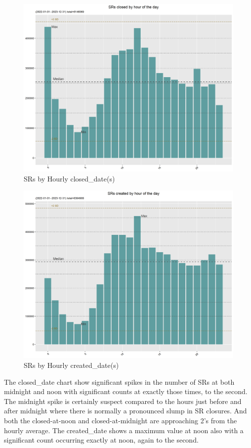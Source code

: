 \documentclass[12pt, titlepage]{article}
\begin{document}
	\begin{figure}[H]
		 \centering
		 \includegraphics[scale = 0.65]{Closed_Hourly_SR_count.png}
		 \caption{SRs by Hourly closed\_date(s)}
		 \label{fig:hourly-closed}
	\end{figure}	
	
	\begin{figure}[H]
		 \centering
		 \includegraphics[scale = 0.65]{Created_Hourly_SR_count.png}
		 \caption{SRs by Hourly created\_date(s)}
		 \label{fig:hourly-created}
	\end{figure}	
	
	The closed\_date chart show significant spikes in the number of SRs at both midnight
	and noon with significant counts at exactly those times, to the second. The midnight spike is certainly suspect compared to the hours just before and after midnight where
	there is normally a pronounced slump in SR closures. And both the closed-at-noon and closed-at-midnight are 
	approaching 2\textsigma's from the hourly average. The created\_date shows a maximum value at noon also with a significant count occurring exactly at noon, again to 
	the second. 
\end{document}

